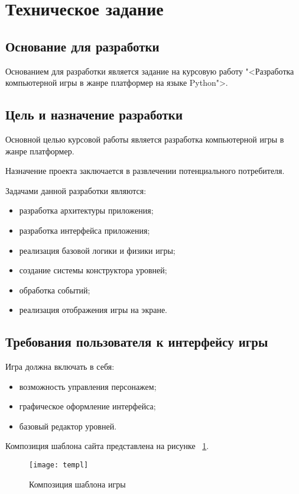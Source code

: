 \section{Техническое задание}
\subsection{Основание для разработки}

Основанием для разработки является задание на курсовую работу "<Разработка компьютерной игры в жанре платформер на языке Python">.

\subsection{Цель и назначение разработки}

Основной целью курсовой работы является разработка компьютерной игры в жанре платформер.

Назначение проекта заключается в развлечении потенциального потребителя.

Задачами данной разработки являются:
\begin{itemize}
\item разработка архитектуры приложения;
\item разработка интерфейса приложения;
\item реализация базовой логики и физики игры;
\item создание системы конструктора уровней;
\item обработка событий;
\item реализация отображения игры на экране.
\end{itemize}

\subsection{Требования пользователя к интерфейсу игры}

Игра должна включать в себя:
\begin{itemize}
    \item возможность управления персонажем;
    \item графическое оформление интерфейса;
    \item базовый редактор уровней.
\end{itemize}

Композиция шаблона сайта представлена на рисунке ~\ref{templ:image}.

\begin{figure}[ht]
\texttt{[image: templ]}
\caption{Композиция шаблона игры}
\label{templ:image}
\end{figure}

